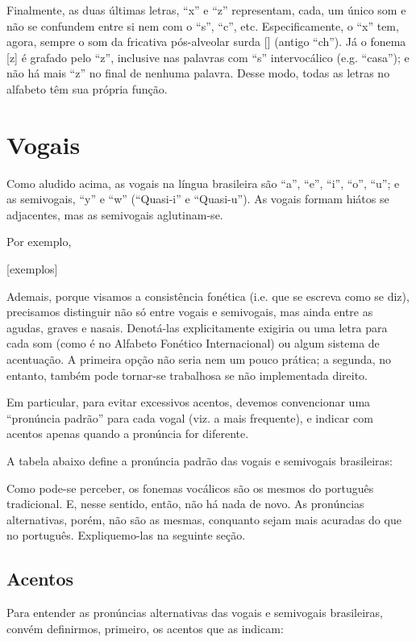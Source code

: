 \documentclass[12pt, a5paper, titlepage]{article}
\begin{document}
\begin{bilingualpages}
    Finalmente, as duas últimas letras, ``x'' e ``z'' representam, cada, um único som e não se confundem entre si nem com o ``s'', ``c'', etc. Especificamente, o ``x'' tem, agora, sempre o som da fricativa pós-alveolar surda [\textesh] (antigo ``ch''). Já o fonema [z] é grafado pelo ``z'', inclusive nas palavras com ``s'' intervocálico (e.g. ``casa''); e não há mais ``z'' no final de nenhuma palavra. Desse modo, todas as letras no alfabeto têm sua própria função.

    \section{Vogais}
    Como aludido acima, as vogais na língua brasileira são ``a'', ``e'', ``i'', ``o'', ``u''; e as semivogais, ``y'' e ``w'' (``Quasi-i'' e ``Quasi-u''). As vogais formam hiátos se adjacentes, mas as semivogais aglutinam-se.
    
    Por exemplo,

    [exemplos]

    Ademais, porque visamos a consistência fonética (i.e. que se escreva como se diz), precisamos distinguir não só entre vogais e semivogais, mas ainda entre as agudas, graves e nasais. Denotá-las explicitamente exigiria ou uma letra para cada som (como é no Alfabeto Fonético Internacional) ou algum sistema de acentuação. A primeira opção não seria nem um pouco prática; a segunda, no entanto, também pode tornar-se trabalhosa se não implementada direito.
    
    Em particular, para evitar excessivos acentos, devemos convencionar uma ``pronúncia padrão'' para cada vogal (viz. a mais frequente), e indicar com acentos apenas quando a pronúncia for diferente.

    A tabela abaixo define a pronúncia padrão das vogais e semivogais brasileiras:

    \PtTableVowels

    Como pode-se perceber, os fonemas vocálicos são os mesmos do português tradicional. E, nesse sentido, então, não há nada de novo. As pronúncias alternativas, porém, não são as mesmas, conquanto sejam mais acuradas do que no português. Expliquemo-las na seguinte seção.

    \subsection{Acentos}
    Para entender as pronúncias alternativas das vogais e semivogais brasileiras, convém definirmos, primeiro, os acentos que as indicam:


\end{bilingualpages}
\end{document}
